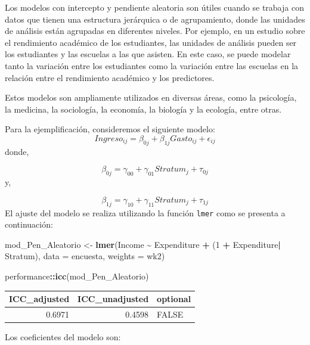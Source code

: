 \documentclass[
  spanish,
  12pt,
]{book}
\newenvironment{Shaded}{\begin{snugshade}}{\end{snugshade}}
\newcommand{\AttributeTok}[1]{\textcolor[rgb]{0.13,0.29,0.53}{#1}}
\newcommand{\DataTypeTok}[1]{\textcolor[rgb]{0.13,0.29,0.53}{#1}}
\newcommand{\DecValTok}[1]{\textcolor[rgb]{0.00,0.00,0.81}{#1}}
\newcommand{\FunctionTok}[1]{\textcolor[rgb]{0.13,0.29,0.53}{\textbf{#1}}}
\newcommand{\NormalTok}[1]{#1}
\newcommand{\OtherTok}[1]{\textcolor[rgb]{0.56,0.35,0.01}{#1}}
\newcommand{\SpecialCharTok}[1]{\textcolor[rgb]{0.81,0.36,0.00}{\textbf{#1}}}
\begin{document}
Los modelos con intercepto y pendiente aleatoria son útiles cuando se trabaja con datos que tienen una estructura jerárquica o de agrupamiento, donde las unidades de análisis están agrupadas en diferentes niveles. Por ejemplo, en un estudio sobre el rendimiento académico de los estudiantes, las unidades de análisis pueden ser los estudiantes y las escuelas a las que asisten. En este caso, se puede modelar tanto la variación entre los estudiantes como la variación entre las escuelas en la relación entre el rendimiento académico y los predictores.

Estos modelos son ampliamente utilizados en diversas áreas, como la psicología, la medicina, la sociología, la economía, la biología y la ecología, entre otras.

Para la ejemplificación, consideremos el siguiente modelo:
\[
Ingreso_{ij}=\beta_{0j}+\beta_{1j}Gasto_{ij}+\epsilon_{ij}
\]
donde,

\[
\beta_{0j} = \gamma_{00}+\gamma_{01}Stratum_{j} + \tau_{0j}
\]
y,

\[
\beta_{1j} = \gamma_{10}+\gamma_{11}Stratum_{j} + \tau_{1j}
\]
El ajuste del modelo se realiza utilizando la función \texttt{lmer} como se presenta a continuación:

\begin{Shaded}
\begin{Highlighting}[]
\NormalTok{mod\_Pen\_Aleatorio }\OtherTok{\textless{}{-}} \FunctionTok{lmer}\NormalTok{(Income }\SpecialCharTok{\textasciitilde{}}\NormalTok{ Expenditure  }\SpecialCharTok{+}\NormalTok{ (}\DecValTok{1} \SpecialCharTok{+}\NormalTok{ Expenditure}\SpecialCharTok{|}\NormalTok{ Stratum),}
  \AttributeTok{data =}\NormalTok{ encuesta, }\AttributeTok{weights  =}\NormalTok{  wk2)}

\NormalTok{performance}\SpecialCharTok{::}\FunctionTok{icc}\NormalTok{(mod\_Pen\_Aleatorio)}
\end{Highlighting}
\end{Shaded}

\begin{tabular}{r|r|l}
\hline
ICC\_adjusted & ICC\_unadjusted & optional\\
\hline
0.6971 & 0.4598 & FALSE\\
\hline
\end{tabular}

Los coeficientes del modelo son:

\begin{Shaded}
\end{Shaded}
\end{document}
